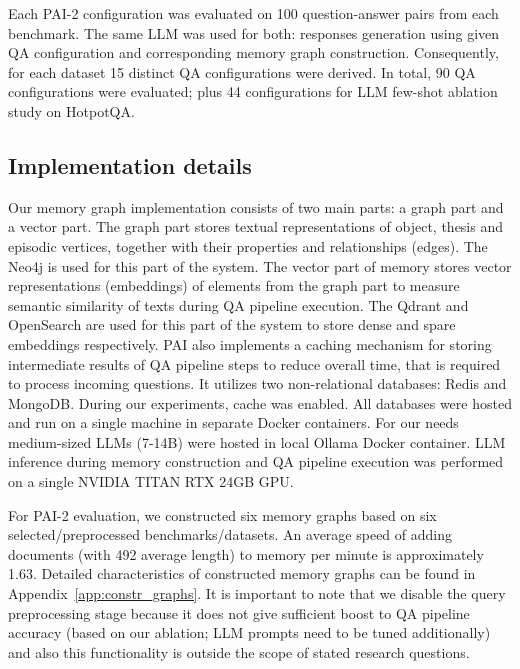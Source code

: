 Each PAI-2 configuration was evaluated on 100 question-answer pairs from each benchmark. The same LLM was used for both: responses generation using given QA configuration and corresponding memory graph construction. Consequently, for each dataset 15 distinct QA configurations were derived. In total, 90 QA configurations were evaluated; plus 44 configurations for LLM few-shot ablation study on HotpotQA. 

\subsection{Implementation details}

Our memory graph implementation consists of two main parts: a graph part and a vector part. The graph part stores textual representations of object, thesis and episodic vertices, together with their properties and relationships (edges). The Neo4j is used for this part of the system. The vector part of memory stores vector representations (embeddings) of elements from the graph part to measure semantic similarity of texts during QA pipeline execution. The Qdrant and OpenSearch are used for this part of the system to store dense and spare embeddings respectively. PAI also implements a caching mechanism for storing intermediate results of QA pipeline steps to reduce overall time, that is required to process incoming questions. It utilizes two non-relational databases: Redis and MongoDB. During our experiments, cache was enabled. All databases were hosted and run on a single machine in separate Docker containers. For our needs medium-sized LLMs (7-14B) were hosted in local Ollama Docker container. LLM inference during memory construction and QA pipeline execution was performed on a single NVIDIA TITAN RTX 24GB GPU. 

For PAI-2 evaluation, we constructed six memory graphs based on six selected/preprocessed benchmarks/datasets. An average speed of adding documents (with 492 average length) to memory per minute is approximately 1.63. Detailed characteristics of constructed memory graphs can be found in Appendix~\ref{app:constr_graphs}. It is important to note that we disable the query preprocessing stage because it does not give sufficient boost to QA pipeline accuracy (based on our ablation; LLM prompts need to be tuned additionally) and also this functionality is outside the scope of stated research questions.